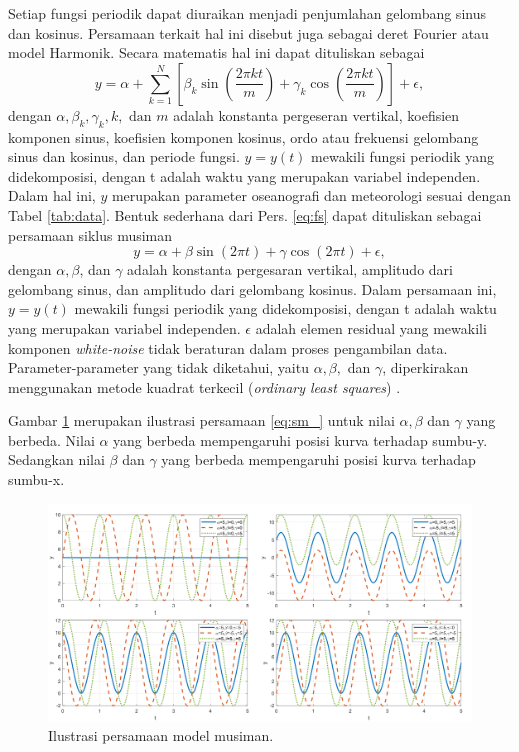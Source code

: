 \begin{spacing}{1.5}
	Setiap fungsi periodik dapat diuraikan menjadi penjumlahan gelombang sinus dan kosinus. Persamaan terkait hal ini disebut juga sebagai deret Fourier atau model Harmonik. Secara matematis hal ini dapat dituliskan sebagai \cite{goela2016time,hyndman2018forecasting} 
	\begin{equation}\label{eq:fs}
		y = \alpha + \sum_{k=1}^{N} \left[ \beta_k \sin(\frac{2\pi kt}{m})+\gamma_k \cos(\frac{2\pi kt}{m})\right]  + \epsilon,
	\end{equation}
	dengan $\alpha, \beta_k, \gamma_k,k,\text{ dan }m$ adalah konstanta pergeseran vertikal, koefisien komponen sinus, koefisien komponen kosinus, ordo atau frekuensi gelombang sinus dan kosinus, dan periode fungsi. $y=y(t)$ mewakili fungsi periodik yang didekomposisi, dengan t adalah waktu yang merupakan variabel independen. Dalam hal ini, $y$ merupakan parameter oseanografi dan meteorologi sesuai dengan Tabel \ref{tab:data}.  Bentuk sederhana dari Pers. \ref{eq:fs} dapat dituliskan sebagai
	persamaan siklus musiman \cite{crawley2012r}
	\begin{equation}\label{eq:sm_}
		y = \alpha + \beta \sin(2\pi t)+\gamma \cos(2\pi t) + \epsilon,
	\end{equation}
	dengan $\alpha, \beta$, dan $\gamma$  adalah konstanta pergesaran vertikal, amplitudo dari gelombang sinus, dan amplitudo dari gelombang kosinus. Dalam persamaan ini, $y=y(t)$ mewakili fungsi periodik yang didekomposisi, dengan t adalah waktu yang merupakan variabel independen. $\epsilon$ adalah elemen residual yang mewakili komponen \textit{white-noise} tidak beraturan dalam proses pengambilan data. Parameter-parameter yang tidak diketahui, yaitu $\alpha, \beta, $ dan $\gamma$, diperkirakan menggunakan metode kuadrat terkecil (\textit{ordinary least squares}) \cite{goela2016time}.
	
	Gambar \ref{fig:sm} merupakan ilustrasi persamaan \ref{eq:sm_} untuk nilai $\alpha,\beta$ dan $\gamma$ yang berbeda. Nilai $\alpha$ yang berbeda mempengaruhi posisi kurva terhadap sumbu-y. Sedangkan nilai $\beta$ dan $\gamma$ yang berbeda mempengaruhi posisi kurva terhadap sumbu-x.
	\begin{figure}[H]
		\centering
		\includegraphics[width=15cm]{contents/Figures/sm_experiment}
		\caption{Ilustrasi persamaan model musiman.}
		\label{fig:sm}
	\end{figure}
	

\end{spacing}
